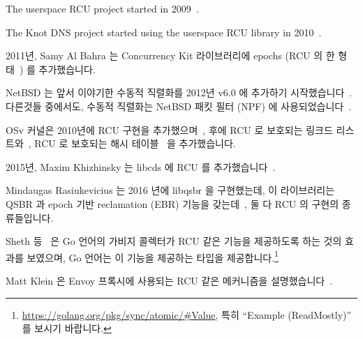 The userspace RCU project started in 2009~\cite{MathieuDesnoyers2009URCU}.

The Knot DNS project started using the userspace RCU
library in 2010~\cite{LubosSlovak2010KnotDNSRCU}.
\fi

2011년, Samy Al Bahra 는 Concurrency Kit 라이브러리에 epochs (RCU 의 한
형태~\cite{KeirAnthonyFraserPhD,KeirFraser2007withoutLocks}) 를 추가했습니다.

NetBSD 는 앞서 이야기한 수동적 직렬화를 2012년 v6.0 에 추가하기
시작했습니다~\cite{NetBSD2012pserialize}.
다른것들 중에서도, 수동적 직렬화는 NetBSD 패킷 필터 (NPF) 에
사용되었습니다~\cite{MindaugasRasiukevicius2014NPFRCU}.
\iffalse

In 2011, Samy Al Bahra added epochs
(a form of RCU~\cite{KeirAnthonyFraserPhD,KeirFraser2007withoutLocks})
to the Concurrency Kit
library~\cite{SamyAlBahra2011ckEpoch}.

NetBSD began using the aforementioned passive serialization with v6.0 in
2012~\cite{NetBSD2012pserialize}.
Among other things, passive serialization is used in
NetBSD packet filter (NPF)~\cite{MindaugasRasiukevicius2014NPFRCU}.
\fi

OSv 커널은 2010년에 RCU 구현을 추가했으며~\cite{AviKivity2013OSvRCU}, 후에 RCU
로 보호되는 링크드 리스트와~\cite{AviKivity2013OSvRCUlist}, RCU 로 보호되는
해시 테이블~\cite{AviKivity2013OSvRCUhash} 을 추가했습니다.

2015년, Maxim Khizhinsky 는 libcds 에 RCU 를
추가했습니다~\cite{MaxKhiszinsky2015C++RCU}.
\iffalse

The OSv kernel added an RCU implementation in 2010~\cite{AviKivity2013OSvRCU},
later adding an RCU-protected linked list~\cite{AviKivity2013OSvRCUlist}
and an RCU-protected hash table~\cite{AviKivity2013OSvRCUhash}.

In 2015, Maxim Khizhinsky added RCU to
libcds~\cite{MaxKhiszinsky2015C++RCU}.
\fi

Mindaugas Rasiukevicius 는 2016 년에 libqsbr 을 구현했는데, 이 라이브러리는
QSBR 과 epoch 기반 reclamation (EBR) 기능을
갖는데~\cite{MindaugasRasiukevicius2016libqsbr}, 둘 다 RCU 의 구현의
종류들입니다.

Sheth 등~\cite{HarshalSheth2016goRCU} 은 Go 언어의 가비지 콜렉터가 RCU 같은
기능을 제공하도록 하는 것의 효과를 보였으며, Go 언어는 이 기능을 제공하는
 타입을 제공합니다.\footnote{
	\url{https://golang.org/pkg/sync/atomic/\#Value}, 특히 ``Example
	(ReadMostly)'' 를 보시기 바랍니다.}

Matt Klein 은 Envoy 프록시에 사용되는 RCU 같은 메커니즘을
설명했습니다~\cite{MattKlein2017EnvoyRCU}.
\iffalse

